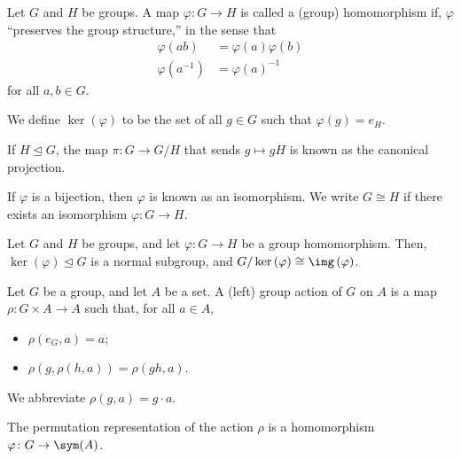 \begin{definition}
  Let $G$ and $H$ be groups. A map $\varphi\colon G\rightarrow H$ is called a (group) homomorphism if, $\varphi$ ``preserves the group structure,'' in the sense that
  \begin{align*}
    \varphi\left(ab\right) &= \varphi(a)\varphi(b)\\
    \varphi\left(a^{-1}\right) &= \varphi(a)^{-1}
  \end{align*}
  for all $a,b\in G$.\newline

  We define $\ker\left(\varphi\right)$ to be the set of all $g\in G$ such that $\varphi\left(g\right) = e_H$.\newline

  If $H\trianglelefteq G$, the map $\pi\colon G\rightarrow G/H$ that sends $g\mapsto gH$ is known as the canonical projection.\newline

  If $\varphi$ is a bijection, then $\varphi$ is known as an isomorphism. We write $G\cong H$ if there exists an isomorphism $\varphi\colon G\rightarrow H$.
\end{definition}
\begin{theorem}
  Let $G$ and $H$ be groups, and let $\varphi\colon G\rightarrow H$ be a group homomorphism. Then, $\ker\left(\varphi\right)\trianglelefteq G$ is a normal subgroup, and $G/\ker\left(\varphi\right)\cong \img\left(\varphi\right)$.
\end{theorem}
\begin{definition}
  Let $G$ be a group, and let $A$ be a set. A (left) group action of $G$ on $A$ is a map $\rho\colon G\times A \rightarrow A$ such that, for all $a\in A$,
  \begin{itemize}
    \item $\rho\left(e_G,a\right) = a$;
    \item $\rho\left(g,\rho\left(h,a\right)\right) = \rho\left(gh,a\right)$.
  \end{itemize}
  We abbreviate $\rho\left(g,a\right) = g\cdot a$.\newline

  The permutation representation of the action $\rho$ is a homomorphism $\varphi\colon G\rightarrow \sym(A)$.
\end{definition}
